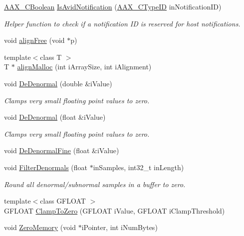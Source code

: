 \begin{DoxyCompactItemize}
\hyperlink{a00149_aa216506530f1d19a2965931ced2b274b}{A\+A\+X\+\_\+\+C\+Boolean} \hyperlink{a00288_ab63efd791ab1cbbcdb004302b106c45c}{Is\+Avid\+Notification} (\hyperlink{a00149_ac678f9c1fbcc26315d209f71a147a175}{A\+A\+X\+\_\+\+C\+Type\+I\+D} in\+Notification\+I\+D)
\begin{DoxyCompactList}\small\item\em Helper function to check if a notification I\+D is reserved for host notifications. \end{DoxyCompactList}\item 
void \hyperlink{a00288_aa7d7e69902012a6272de3ea9aa0264a9}{align\+Free} (void $\ast$p)
\item 
{\footnotesize template$<$class T $>$ }\\T $\ast$ \hyperlink{a00288_aaa3236d90a0dbbf30150d8a181f2d66b}{align\+Malloc} (int i\+Array\+Size, int i\+Alignment)
\item 
void \hyperlink{a00288_aaf103dc75b68b6c4f6792dd26f9b4fd0}{De\+Denormal} (double \&i\+Value)
\begin{DoxyCompactList}\small\item\em Clamps very small floating point values to zero. \end{DoxyCompactList}\item 
void \hyperlink{a00288_aedfd1762f559291ceddd53f8ce8862a5}{De\+Denormal} (float \&i\+Value)
\begin{DoxyCompactList}\small\item\em Clamps very small floating point values to zero. \end{DoxyCompactList}\item 
void \hyperlink{a00288_ac52b6214a1de32e59b90ddbc1878e515}{De\+Denormal\+Fine} (float \&i\+Value)
\item 
void \hyperlink{a00288_a73dd9a17abecc28625c4d34279e4534f}{Filter\+Denormals} (float $\ast$in\+Samples, int32\+\_\+t in\+Length)
\begin{DoxyCompactList}\small\item\em Round all denormal/subnormal samples in a buffer to zero. \end{DoxyCompactList}\item 
{\footnotesize template$<$class G\+F\+L\+O\+A\+T $>$ }\\G\+F\+L\+O\+A\+T \hyperlink{a00288_a6b1f85f5d8c5837ff52212e13b84e6d0}{Clamp\+To\+Zero} (G\+F\+L\+O\+A\+T i\+Value, G\+F\+L\+O\+A\+T i\+Clamp\+Threshold)
\item 
void \hyperlink{a00288_ae9c9b3862c1b63dc4fb4e3c901d42935}{Zero\+Memory} (void $\ast$i\+Pointer, int i\+Num\+Bytes)

\end{DoxyCompactItemize}
